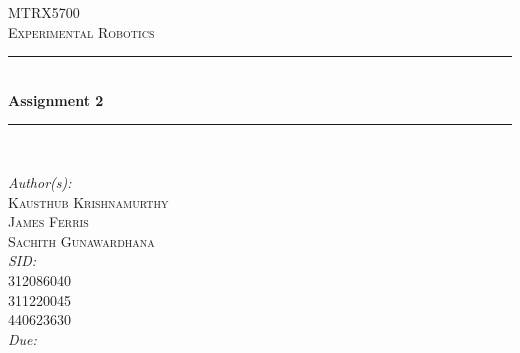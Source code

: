 \begin{titlepage}
	\newcommand{\HRule}{\rule{\linewidth}{0.5mm}}
	\center
	\textsc{\LARGE MTRX5700 \\[0.5cm]Experimental Robotics}\\[1cm] 
	\HRule \\[0.4cm]
	{ \huge \bfseries Assignment 2}\\[0.4cm] 
	\HRule \\[1.5cm]
	\begin{minipage}{1\textwidth}
		\large
		\flushleft
		\emph{Author(s):}\hspace{0.2cm}\textsc{\\Kausthub Krishnamurthy\\James Ferris\\Sachith Gunawardhana}\\ [0.25cm]
		\emph{SID:}\hspace{0.7cm}	\\312086040\\311220045\\440623630\\[0.5cm]
		\emph{Due:}
		\hspace{0.55cm}{March 25, 2015}\hspace{1cm}\\[3cm]	%
	\end{minipage}
	\vfill
\end{titlepage}